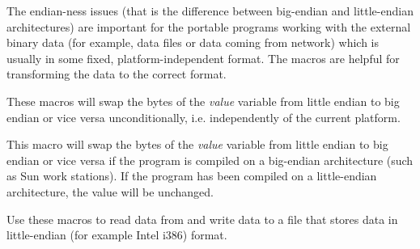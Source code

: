 The endian-ness issues (that is the difference between big-endian and
little-endian architectures) are important for the portable programs working
with the external binary data (for example, data files or data coming from
network) which is usually in some fixed, platform-independent format. The
macros are helpful for transforming the data to the correct format.


\label{intswapalways}





These macros will swap the bytes of the {\it value} variable from little
endian to big endian or vice versa unconditionally, i.e. independently of the
current platform.


\label{intswaponbe}





This macro will swap the bytes of the {\it value} variable from little
endian to big endian or vice versa if the program is compiled on a
big-endian architecture (such as Sun work stations). If the program has
been compiled on a little-endian architecture, the value will be unchanged.

Use these macros to read data from and write data to a file that stores
data in little-endian (for example Intel i386) format.


\label{intswaponle}





